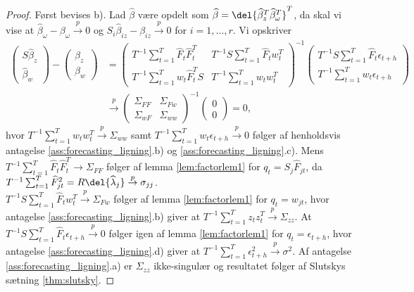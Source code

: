 \begin{proof}
Først bevises b). 
Lad \(\widehat{\beta}\) være opdelt som \(\widehat{\beta} = \del{\widehat{\beta}_z^T \widehat{\beta}_\omega^T}^T\), da skal vi vise at \(\widehat{\beta}_\omega - \beta_\omega \overset{p}{\rightarrow} 0\) og \(S_i \widehat{\beta}_{iz} - \beta_{iz} \overset{p}{\rightarrow} 0\) for \(i = 1, \ldots, r\).
Vi opskriver
\begin{align*}
\begin{pmatrix}
S \widehat{\beta}_z \\ \widehat{\beta}_w
\end{pmatrix} - \begin{pmatrix}
\beta_z \\ \beta_w
\end{pmatrix} &= \begin{pmatrix}
T^{-1} \sum_{t=1}^T \widehat{F}_t \widehat{F}_t^T & T^{-1} S \sum_{t=1}^T \widehat{F}_t w_t^T \\
T^{-1} \sum_{t=1}^T w_t \widehat{F}_t^T S & T^{-1} \sum_{t=1}^T w_t w_t^T
\end{pmatrix}^{-1} \begin{pmatrix}
T^{-1} S \sum_{t=1}^T \widehat{F}_t \epsilon_{t+h} \\
T^{-1} \sum_{t=1}^T w_t \epsilon_{t+h}
\end{pmatrix} \\
&\overset{p}{\rightarrow} \begin{pmatrix}
\Sigma_{FF} & \Sigma_{Fw} \\ \Sigma_{wF} & \Sigma_{ww}   
\end{pmatrix}^{-1} \begin{pmatrix}
0 \\ 0
\end{pmatrix} = 0,
\end{align*}
hvor 
\(T^{-1} \sum_{t=1}^T w_t w_t^T \overset{p}{\rightarrow} \Sigma_{ww}\) samt \(T^{-1} \sum_{t=1}^T w_t \epsilon_{t+h} \overset{p}{\rightarrow} 0\) følger af henholdsvis antagelse \ref{ass:forecasting_ligning}.b) og \ref{ass:forecasting_ligning}.c).
Mens \(T^{-1} \sum_{t=1}^T \widehat{F}_t \widehat{F}_t^T \rightarrow \Sigma_{FF}\) følger af lemma \ref{lem:factorlem1} for \(q_t = S_j \widehat{F}_{jt}\), da \(T^{-1} \sum_{t=1}^T \widehat{F}_{jt}^2 = R \del{\widehat{\lambda}_j} \overset{p}{\rightarrow} \sigma_{jj}\).\\
\(T^{-1} S \sum_{t=1}^T \widehat{F}_t w_t^T \overset{p}{\rightarrow} \Sigma_{Fw}\) følger af  lemma \ref{lem:factorlem1} for \(q_t = w_{jt}\), hvor antagelse \ref{ass:forecasting_ligning}.b) giver at \(T^{-1} \sum_{t=1}^T z_t z_t^T \overset{p}{\rightarrow} \Sigma_{zz}\).
At \(T^{-1} S \sum_{t=1}^T \widehat{F}_t \epsilon_{t+h} \overset{p}{\rightarrow} 0\) følger igen af lemma \ref{lem:factorlem1} for \(q_t = \epsilon_{t+h}\), hvor antagelse \ref{ass:forecasting_ligning}.d) giver at \(T^{-1} \sum_{t=1}^T \epsilon_{t+h}^2 \overset{p}{\rightarrow} \sigma^2\).
Af antagelse \ref{ass:forecasting_ligning}.a) er \(\Sigma_{zz}\) ikke-singulær og resultatet følger af Slutskys sætning \ref{thm:slutsky}.


\end{proof}
